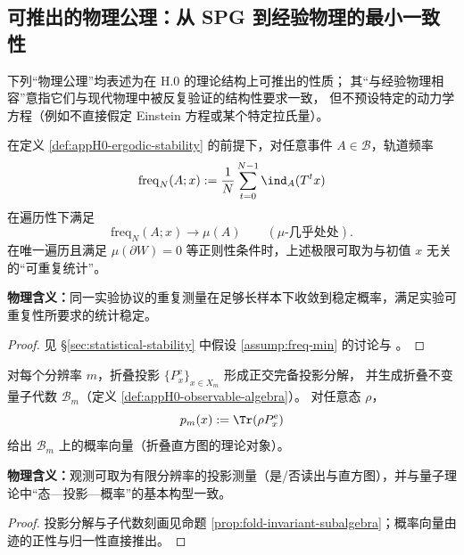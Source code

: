\subsection{可推出的物理公理：从 SPG 到经验物理的最小一致性}
\label{subsec:appH1-physical-axioms}
\setcounter{physicalaxiom}{0}

下列“物理公理”均表述为在 H.0 的理论结构上可推出的性质；
其“与经验物理相容”意指它们与现代物理中被反复验证的结构性要求一致，
但不预设特定的动力学方程（例如不直接假定 Einstein 方程或某个特定拉氏量）。

\begin{physicalaxiom}[可重复性与统计稳定性]\label{ax:P1-repeatability}
在定义 \ref{def:appH0-ergodic-stability} 的前提下，对任意事件 \(A\in\mathcal{B}\)，轨道频率
\[
\mathrm{freq}_N(A;x):=\frac{1}{N}\sum_{t=0}^{N-1}\ind_A(T^t x)
\]
在遍历性下满足
\[
\mathrm{freq}_N(A;x)\to \mu(A)\qquad(\mu\text{-几乎处处}).
\]
在唯一遍历且满足 \(\mu(\partial W)=0\) 等正则性条件时，上述极限可取为与初值 \(x\) 无关的“可重复统计”。

\medskip\noindent\textbf{物理含义：}同一实验协议的重复测量在足够长样本下收敛到稳定概率，满足实验可重复性所要求的统计稳定。
\end{physicalaxiom}
\begin{proof}
见 \S\ref{sec:statistical-stability} 中假设 \ref{assump:freq-min} 的讨论与 \cite{WaltersErgodicTheory}。
\end{proof}

\begin{physicalaxiom}[投影读出与量子概率的兼容]\label{ax:P2-projection-prob}
对每个分辨率 \(m\)，折叠投影 \(\{P_x^{\mathrm e}\}_{x\in X_m}\) 形成正交完备投影分解，
并生成折叠不变量子代数 \(\mathcal{B}_m\)（定义 \ref{def:appH0-observable-algebra}）。
对任意态 \(\rho\)，
\[
p_m(x):=\Tr(\rho P_x^{\mathrm e})
\]
给出 \(\mathcal{B}_m\) 上的概率向量（折叠直方图的理论对象）。

\medskip\noindent\textbf{物理含义：}观测可取为有限分辨率的投影测量（是/否读出与直方图），并与量子理论中“态—投影—概率”的基本构型一致。
\end{physicalaxiom}
\begin{proof}
投影分解与子代数刻画见命题 \ref{prop:fold-invariant-subalgebra}；概率向量由迹的正性与归一性直接推出。
\end{proof}

